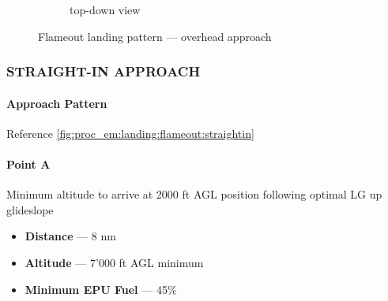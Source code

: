 \begin{figure}[htbp]
\begin{subfigure}[t]{\linewidth}
        \caption{top-down view}
    \end{subfigure}
    \caption{Flameout landing pattern --- overhead approach}
    \label{fig:proc_em:landing:flameout:overhead}
\end{figure}


\clearpage

\subsubsection{STRAIGHT-IN APPROACH}
\label{subsec:proc_em:landing:flameout:straightin}

\paragraph{Approach Pattern}
Reference \cref{fig:proc_em:landing:flameout:straightin}

\paragraph{Point A}
Minimum altitude to arrive at 2000 ft AGL position following optimal LG up glideslope 
\begin{itemize}
    \item \textbf{Distance} --- 8 nm 
    \item \textbf{Altitude} --- 7'000 ft AGL minimum
    \item \textbf{Minimum EPU Fuel} --- 45\%
\end{itemize}

